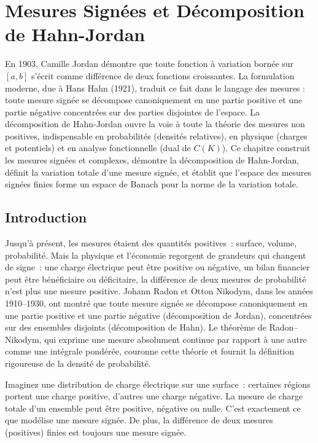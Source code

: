 \chapter{Mesures Sign\'ees et D\'ecomposition de Hahn-Jordan}
\label{ch:mesures_signees}

En 1903, Camille Jordan démontre que toute fonction à variation bornée sur $[a,b]$ s'écrit comme différence de deux fonctions croissantes. La formulation moderne, due à Hans Hahn (1921), traduit ce fait dans le langage des mesures : toute mesure signée se décompose canoniquement en une partie positive et une partie négative concentrées sur des parties disjointes de l'espace. La décomposition de Hahn-Jordan ouvre la voie à toute la théorie des mesures non positives, indispensable en probabilités (densités relatives), en physique (charges et potentiels) et en analyse fonctionnelle (dual de $C(K)$). Ce chapitre construit les mesures signées et complexes, démontre la décomposition de Hahn-Jordan, définit la variation totale d'une mesure signée, et établit que l'espace des mesures signées finies forme un espace de Banach pour la norme de la variation totale.

\section{Introduction}

Jusqu'\`a pr\'esent, les mesures \'etaient des quantit\'es positives~: surface, volume, probabilit\'e. Mais la physique et l'\'economie regorgent de grandeurs qui changent de signe~: une charge \'electrique peut \^etre positive ou n\'egative, un bilan financier peut \^etre b\'en\'eficiaire ou d\'eficitaire, la diff\'erence de deux mesures de probabilit\'e n'est plus une mesure positive. Johann Radon et Otton Nikodym, dans les ann\'ees 1910--1930, ont montr\'e que toute mesure sign\'ee se d\'ecompose canoniquement en une partie positive et une partie n\'egative (d\'ecomposition de Jordan), concentr\'ees sur des ensembles disjoints (d\'ecomposition de Hahn). Le th\'eor\`eme de Radon--Nikodym, qui exprime une mesure absolument continue par rapport \`a une autre comme une int\'egrale pond\'er\'ee, couronne cette th\'eorie et fournit la d\'efinition rigoureuse de la densit\'e de probabilit\'e.

\begin{intuition}[title=\textbf{Pourquoi des mesures sign\'ees~?}]
Imaginez une distribution de charge \'electrique sur une surface~: certaines r\'egions
portent une charge positive, d'autres une charge n\'egative. La \og mesure de charge \fg
totale d'un ensemble peut \^etre positive, n\'egative ou nulle. C'est exactement ce que
mod\'elise une mesure sign\'ee. De plus, la diff\'erence de deux mesures (positives) finies
est toujours une mesure sign\'ee.
\end{intuition}

